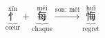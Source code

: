 \[ \underbrace{\overset{\text{xīn}}{\text{忄}}}_{\text{cœur}} + \underbrace{\overset{\text{měi}}{\text{每}}}_{\text{chaque}} \xrightarrow{\text{son: měi}} \underbrace{\overset{\text{huǐ}}{\text{悔}}}_{\text{regret}} \]
